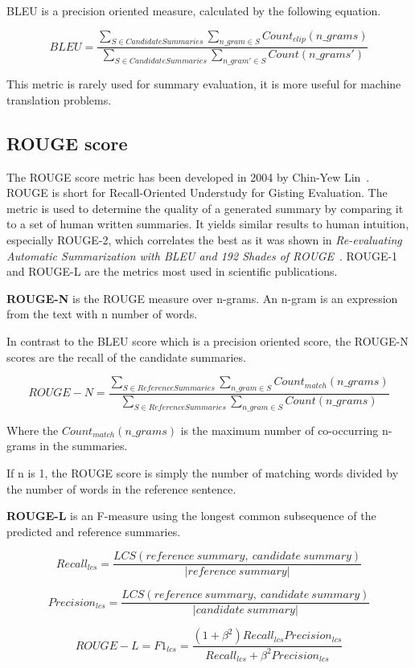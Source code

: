 BLEU is a precision oriented measure, calculated by the following equation.

\[BLEU = \frac{\sum_{S \in CandidateSummaries}\sum_{n\_gram \in S} Count_{clip} (n\_grams)}{\sum_{S \in CandidateSummaries}\sum_{n\_gram' \in S} Count(n\_grams')}\]

This metric is rarely used for summary evaluation, it is more useful for machine translation problems.

\subsection{ROUGE score}
The ROUGE score metric has been developed in 2004 by Chin-Yew Lin~\cite{ROUGE}. ROUGE is short for Recall-Oriented Understudy for Gisting Evaluation. The metric is used to determine the quality of a generated summary by comparing it to a set of human written summaries. It yields similar results to human intuition, especially ROUGE-2, which correlates the best as it was shown in \textit{Re-evaluating Automatic Summarization with BLEU and 192 Shades of ROUGE}~\cite{ShadesOfROUGE}. ROUGE-1 and ROUGE-L are the metrics most used in scientific publications.

\textbf{ROUGE-N} is the ROUGE measure over n-grams. An n-gram is an expression from the text with n number of words.

In contrast to the BLEU score which is a precision oriented score, the ROUGE-N scores are the recall of the candidate summaries.

\[ROUGE-N = \frac{\sum_{S \in ReferenceSummaries}\sum_{n\_gram \in S} Count_{match} (n\_grams)}{\sum_{S \in ReferenceSummaries}\sum_{n\_gram \in S} Count(n\_grams)}\]

Where the \(Count_{match}(n\_grams)\) is the maximum number of co-occurring n-grams in the summaries.

If n is 1, the ROUGE score is simply the number of matching words divided by the number of words in the reference sentence.

\textbf{ROUGE-L} is an F-measure using the longest common subsequence of the predicted and reference summaries.

\[Recall_{lcs} = \frac{LCS(reference\ summary,\ candidate\ summary)}{|reference\ summary|}\]

\[Precision_{lcs} = \frac{LCS(reference\ summary,\ candidate\ summary)}{|candidate\ summary|}\]

\[ROUGE-L = F1_{lcs} = \frac{(1 + \beta^2)Recall_{lcs}Precision_{lcs}}{Recall_{lcs} + \beta^2Precision_{lcs}}\]

